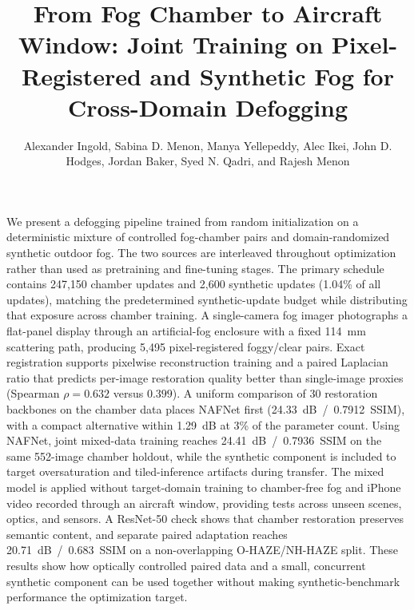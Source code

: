 \documentclass{optica-article}
\begin{document}
\title{From Fog Chamber to Aircraft Window: Joint Training on Pixel-Registered and Synthetic Fog for Cross-Domain Defogging}

\author{Alexander Ingold, Sabina D. Menon, Manya Yellepeddy, Alec Ikei, John D. Hodges, Jordan Baker, Syed N. Qadri, and Rajesh Menon}

\address{ Department of Electrical and Computer Engineering, University of Utah, Salt Lake City, UT 84112, USA\\
 U.S. Naval Research Laboratory Remote Sensing Division, Washington DC 20375, USA.\\}



\begin{abstract*}
We present a defogging pipeline trained from random initialization on
a deterministic mixture of controlled fog-chamber pairs and
domain-randomized synthetic outdoor fog. The two sources are
interleaved throughout optimization rather than used as pretraining
and fine-tuning stages. The primary schedule contains 247{,}150
chamber updates and 2{,}600 synthetic updates (1.04\% of all
updates), matching the predetermined synthetic-update budget while
distributing that exposure across chamber training. A single-camera fog imager
photographs a flat-panel display through an artificial-fog enclosure
with a fixed 114~mm scattering path, producing 5{,}495
pixel-registered foggy/clear pairs. Exact registration supports
pixelwise reconstruction training and a paired Laplacian ratio that
predicts per-image restoration quality better than single-image
proxies (Spearman $\rho=0.632$ versus $0.399$). A uniform comparison
of 30 restoration backbones on the chamber data places NAFNet first
(24.33~dB~/~0.7912~SSIM), with a compact alternative within
1.29~dB at 3\% of the parameter count. Using NAFNet, joint mixed-data
training reaches 24.41~dB~/~0.7936~SSIM on the same 552-image chamber
holdout, while the synthetic component is included to target
oversaturation and tiled-inference artifacts during transfer. The
mixed model is applied without target-domain training to
chamber-free fog and iPhone video recorded through an aircraft
window, providing tests across unseen scenes, optics, and sensors.
A ResNet-50 check shows that chamber restoration preserves
semantic content, and separate paired adaptation reaches
20.71~dB~/~0.683~SSIM on a non-overlapping O-HAZE/NH-HAZE split.
These results show how optically controlled paired data and a small,
concurrent synthetic component can be used together without making
synthetic-benchmark performance the optimization target.
\end{abstract*}
\end{document}
